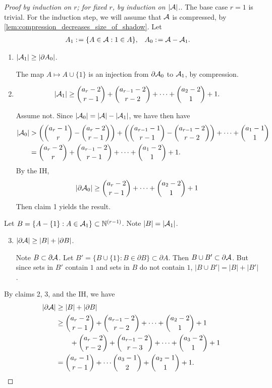 \begin{proof}[Proof by induction on $r$; for fixed $r$, by induction on $|\mathcal{A}|$.] The base case $r=1$ is trivial. For the induction step, we will assume that $\mathcal{A}$ is compressed, by \cref{lem:compression_decreases_size_of_shadow}. Let
\begin{align*}	
A_1 :\!&= \{A\in \mathcal{A}: 1\in A\}, & A_0 :\!&= \mathcal{A}- \mathcal{A}_1.
\end{align*}

\begin{enumerate}[{Claim} 1:]
\item $|\mathcal{A}_1| \geq |\partial A_0|$.

\begin{subproof}	
The map $A\mapsto A\cup\{1\}$ is an injection from $\partial \mathcal{A}_0$ to $\mathcal{A}_1$, by compression.
\end{subproof}
	\item
	\[
	|\mathcal{A}_1|\geq {a_r-2\choose r-1} + {a_{r-1}-2\choose r-2} + \dotsb + {a_2-2\choose 1} + 1.
	\]
	\begin{subproof}Assume not. Since $|\mathcal{A}_0| =|\mathcal{A}| - |\mathcal{A}_1|$, we have then have
	\begin{align*}	
	|\mathcal{A}_0|&> \left( {a_r-1\choose r} - {a_r-2\choose r-1} \right) + \left( {a_{r-1}-1\choose r-1} - {a_{r-1}-2\choose r-2} \right) + \dotsb + {a_1-1 \choose 1}\\
	&= {a_{r}-2 \choose r} + {a_{r-1}-2\choose r-1} + \dotsb + {a_1-2 \choose 1}+1.
	\end{align*}
	By the IH, 
\[
|\partial \mathcal{A}_0| \geq {a_r-2\choose r-1} + \dotsb + {a_2-2\choose 1}+1
\]
Then claim 1 yields the result.
	\end{subproof}
\end{enumerate}
Let $B = \{A-\{1\}: A\in \mathcal{A}_1\}\subset \mathbb{N}^{(r-1)}$. Note $|B| = |\mathcal{A}_1|$.
\begin{enumerate}[{Claim} 1:]
\setcounter{enumi}{2}
	\item 
	$|\partial \mathcal{A}|\geq |B| + |\partial B|$.

	\begin{subproof}	
	Note $B\subset \partial \mathcal{A}$. Let $B' = \{B\cup \{1\}: B\in \partial B\} \subset \partial A$. Then $B\cup B' \subset \partial \mathcal{A}$. But since sets in $B'$ contain $1$ and sets in $B$ do not contain $1$, $|B\cup B'| = |B|+|B'|$.
	\end{subproof}
\end{enumerate}
By claims 2, 3, and the IH, we have
\begin{align*}	
|\partial \mathcal{A}| &\geq |B| + |\partial B| \\
&\geq {a_r-2 \choose r-1} + {a_{r-1}-2\choose r-2} + \dotsb + {a_2-2\choose 1}+1 \\
&\qquad + {a_r-2 \choose r-2} + {a_{r-1}-2 \choose r-3} + \dotsb + {a_3-2\choose 1} + 1\\
&= {a_r-1\choose r-1} + \dotsb {a_3-1\choose 2} + {a_2-1\choose 1}+1.  \qedhere
\end{align*}
\end{proof}
